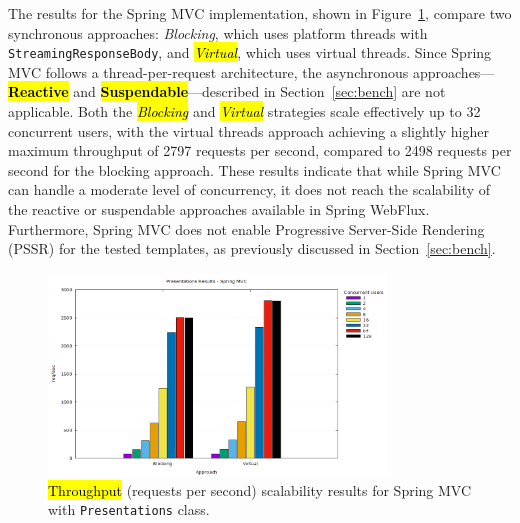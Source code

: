 \documentclass[software,article,accept,pdftex,moreauthors]{Definitions/mdpi}
\begin{document}
The results for the Spring MVC implementation, shown in
Figure~\ref{fig:presentations-springmvc-jmeter}, compare two synchronous
approaches: \textit{Blocking}, which uses platform threads with
\texttt{StreamingResponseBody}, and \textit{\hl{Virtual}}, which uses virtual
threads. Since Spring MVC follows a thread-per-request architecture, the
asynchronous approaches---\textbf{\hl{Reactive}} and \textbf{\hl{Suspendable}}---described in
Section~\ref{sec:bench} are not applicable. Both the \textit{\hl{Blocking}} and
\textit{\hl{Virtual}} strategies scale effectively up to 32 concurrent users, with
the virtual threads approach achieving a slightly higher maximum throughput of
2797 requests per second, compared to 2498 requests per second for the
blocking approach. These results indicate that while Spring MVC can handle a
moderate level of concurrency, it does not reach the scalability of the
reactive or suspendable approaches available in Spring WebFlux. Furthermore,
Spring MVC does not enable Progressive Server-Side Rendering (PSSR) for the
tested templates, as previously discussed in Section~\ref{sec:bench}.

\begin{figure}[H]
\vspace{-6pt}
     \includegraphics[width=0.8\textwidth]{./Graphs/presentations-springmvc-jmeter.png}
     \caption{\hl{Throughput} %
 (requests per second) scalability results for Spring MVC with \texttt{Presentations} class.}\label{fig:presentations-springmvc-jmeter}
\end{figure}
\end{document}
